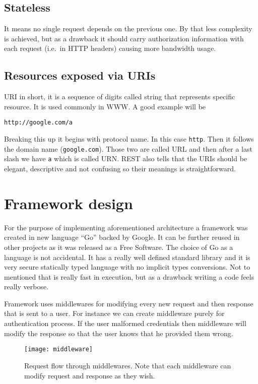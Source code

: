 \subsection{Stateless}
\label{sec:stateless}
It means no single request depends on the previous one. By that less complexity is achieved, but as a drawback it should carry authorization information with each request (i.e.\ in HTTP headers) causing more bandwidth usage.

\subsection{Resources exposed via URIs}
\label{sec:resources}
URI\cite{URI-wiki} in short, it is a sequence of digits called string that represents specific resource. It is used commonly in WWW\@. A good example will be
\begin{verbatim}
http://google.com/a
\end{verbatim}
Breaking this up it begins with protocol name. In this case \verb|http|. Then it follows the domain name (\verb|google.com|). Those two are called URL and then after a last slash we have \verb|a| which is called URN\@. REST also tells that the URIs should be elegant, descriptive and not confusing so their meanings is straightforward.

\section{Framework design}
For the purpose of implementing aforementioned architecture a framework was created in new language ``Go'' backed by Google\cite{Go-wiki}. It can be further reused in other projects as it was released as a Free Software. The choice of Go as a language is not accidental. It has a really well defined standard library and it is very secure statically typed language with no implicit types conversions. Not to mentioned that is really fast in execution, but as a drawback writing a code feels really verbose.

Framework uses middlewares for modifying every new request and then response that is sent to a user. For instance we can create middleware purely for authentication process. If the user malformed credentials then middleware will modify the response so that the user knows that he provided them wrong.

\begin{figure}[!htbp]
\centering
\texttt{[image: middleware]}
\caption[Request flow through middlewares]{Request flow through middlewares. Note that each middleware can modify request and response as they wish.}
\label{fig:middleware}
\end{figure}

